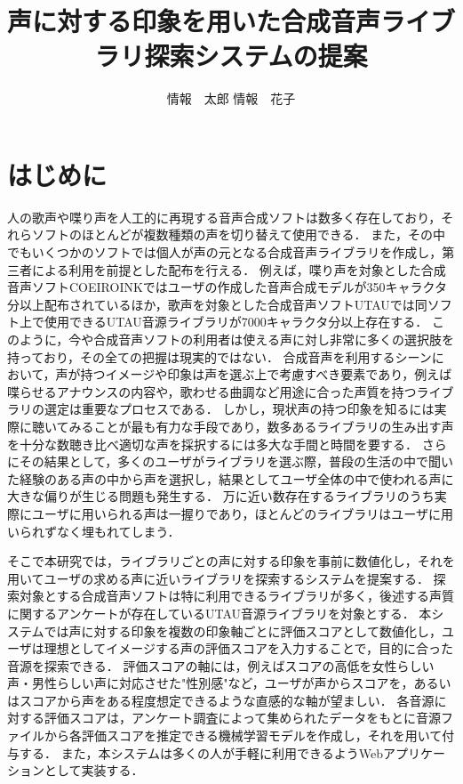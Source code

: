 \documentclass[a4j,8pt,twocolumn]{extarticle}
\title{声に対する印象を用いた合成音声ライブラリ探索システムの提案}
\author{情報　太郎 \qquad 情報　花子}
\affiliation{情報大学情報学部}
\begin{document}
\maketitle
\thispagestyle{empty}	%

\section{はじめに}

人の歌声や喋り声を人工的に再現する音声合成ソフトは数多く存在しており，それらソフトのほとんどが複数種類の声を切り替えて使用できる．
また，その中でもいくつかのソフトでは個人が声の元となる合成音声ライブラリを作成し，第三者による利用を前提とした配布を行える．
例えば，喋り声を対象とした合成音声ソフトCOEIROINKではユーザの作成した音声合成モデルが350キャラクタ分以上配布されているほか\cite{mycoeiroink}，歌声を対象とした合成音声ソフトUTAUでは同ソフト上で使用できるUTAU音源ライブラリが7000キャラクタ分以上存在する\cite{vdbutau}．
このように，今や合成音声ソフトの利用者は使える声に対し非常に多くの選択肢を持っており，その全ての把握は現実的ではない．
合成音声を利用するシーンにおいて，声が持つイメージや印象は声を選ぶ上で考慮すべき要素であり，例えば喋らせるアナウンスの内容や，歌わせる曲調など用途に合った声質を持つライブラリの選定は重要なプロセスである．
しかし，現状声の持つ印象を知るには実際に聴いてみることが最も有力な手段であり，数多あるライブラリの生み出す声を十分な数聴き比べ適切な声を採択するには多大な手間と時間を要する．
さらにその結果として，多くのユーザがライブラリを選ぶ際，普段の生活の中で聞いた経験のある声の中から声を選択し，結果としてユーザ全体の中で使われる声に大きな偏りが生じる問題も発生する．
万に近い数存在するライブラリのうち実際にユーザに用いられる声は一握りであり，ほとんどのライブラリはユーザに用いられずなく埋もれてしまう．

そこで本研究では，ライブラリごとの声に対する印象を事前に数値化し，それを用いてユーザの求める声に近いライブラリを探索するシステムを提案する．
探索対象とする合成音声ソフトは特に利用できるライブラリが多く，後述する声質に関するアンケートが存在しているUTAU音源ライブラリを対象とする．
本システムでは声に対する印象を複数の印象軸ごとに評価スコアとして数値化し，ユーザは理想としてイメージする声の評価スコアを入力することで，目的に合った音源を探索できる．
評価スコアの軸には，例えばスコアの高低を女性らしい声・男性らしい声に対応させた"性別感"など，ユーザが声からスコアを，あるいはスコアから声をある程度想定できるような直感的な軸が望ましい．
各音源に対する評価スコアは，アンケート調査によって集められたデータをもとに音源ファイルから各評価スコアを推定できる機械学習モデルを作成し，それを用いて付与する．
また，本システムは多くの人が手軽に利用できるようWebアプリケーションとして実装する．
\end{document}
